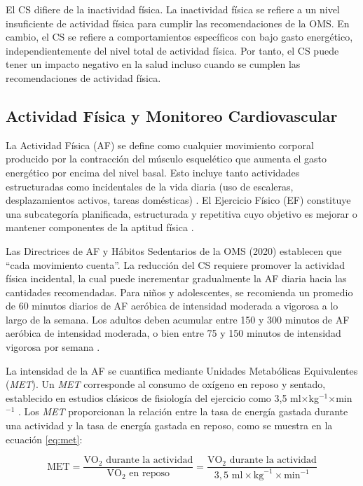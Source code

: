 El CS difiere de la inactividad física. La inactividad física se refiere a un nivel insuficiente de actividad física para cumplir las recomendaciones de la OMS. En cambio, el CS se refiere a comportamientos específicos con bajo gasto energético, independientemente del nivel total de actividad física. Por tanto, el CS puede tener un impacto negativo en la salud incluso cuando se cumplen las recomendaciones de actividad física.

\subsection{Actividad Física y Monitoreo Cardiovascular}
\label{subsec:af_biomarcadores}

La Actividad Física (AF) se define como cualquier movimiento corporal producido por la contracción del músculo esquelético que aumenta el gasto energético por encima del nivel basal. Esto incluye tanto actividades estructuradas como incidentales de la vida diaria (uso de escaleras, desplazamientos activos, tareas domésticas) \cite{Caspersen1985,Reyes2023Actividad}. El Ejercicio Físico (EF) constituye una subcategoría planificada, estructurada y repetitiva cuyo objetivo es mejorar o mantener componentes de la aptitud física \cite{Caspersen1985}.

Las Directrices de AF y Hábitos Sedentarios de la OMS (2020) establecen que ``cada movimiento cuenta''. La reducción del CS requiere promover la actividad física incidental, la cual puede incrementar gradualmente la AF diaria hacia las cantidades recomendadas. Para niños y adolescentes, se recomienda un promedio de 60 minutos diarios de AF aeróbica de intensidad moderada a vigorosa a lo largo de la semana. Los adultos deben acumular entre 150 y 300 minutos de AF aeróbica de intensidad moderada, o bien entre 75 y 150 minutos de intensidad vigorosa por semana \cite{WHO2020,Bull2020,WHO2020GuidelinesAnnex}.

La intensidad de la AF se cuantifica mediante Unidades Metabólicas Equivalentes (\textit{MET}). Un \textit{MET} corresponde al consumo de oxígeno en reposo y sentado, establecido en estudios clásicos de fisiología del ejercicio como 3,5 ml$\times$kg$^{-1}$$\times$min$^{-1}$ \cite{Riebe2018ACSM}. Los \textit{MET} proporcionan la relación entre la tasa de energía gastada durante una actividad y la tasa de energía gastada en reposo, como se muestra en la ecuación \ref{eq:met}:

\begin{equation}
\text{MET} = \frac{\text{VO}_2 \text{ durante la actividad}}{\text{VO}_2 \text{ en reposo}} = \frac{\text{VO}_2 \text{ durante la actividad}}{3,5 \text{ ml}\times\text{kg}^{-1}\times\text{min}^{-1}}
\label{eq:met}
\end{equation}

